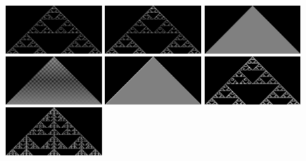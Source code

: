\documentclass{article}
\begin{document}
\begin{figure}
    \centering
    \includegraphics[width=0.32\textwidth]{ca-rules/single1/rule-018-090-146-218.png}%
    \hspace{0.01\textwidth}%
    \includegraphics[width=0.32\textwidth]{ca-rules/single1/rule-022.png}\hspace{0.01\textwidth}%
    \includegraphics[width=0.32\textwidth]{ca-rules/single1/rule-050-122-178-250.png}\\
    \vspace{0.01\textwidth}%
    \includegraphics[width=0.32\textwidth]{ca-rules/single1/rule-054.png}\hspace{0.01\textwidth}%
    \includegraphics[width=0.32\textwidth]{ca-rules/single1/rule-094.png}\hspace{0.01\textwidth}%
    \includegraphics[width=0.32\textwidth]{ca-rules/single1/rule-126.png}\\
    \vspace{0.01\textwidth}
    \includegraphics[width=0.32\textwidth]{ca-rules/single1/rule-150.png}\hspace{0.01\textwidth}%

\end{figure}
\end{document}
